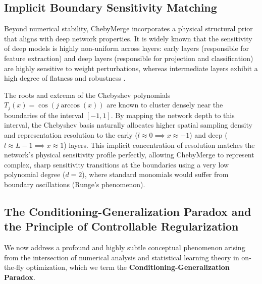 \subsection{Implicit Boundary Sensitivity Matching}
Beyond numerical stability, ChebyMerge incorporates a physical structural prior that aligns with deep network properties. It is widely known that the sensitivity of deep models is highly non-uniform across layers: early layers (responsible for feature extraction) and deep layers (responsible for projection and classification) are highly sensitive to weight perturbations, whereas intermediate layers exhibit a high degree of flatness and robustness \cite{zhang2019all}.

The roots and extrema of the Chebyshev polynomials $T_j(x) = \cos(j \arccos(x))$ are known to cluster densely near the boundaries of the interval $[-1, 1]$. By mapping the network depth to this interval, the Chebyshev basis naturally allocates higher spatial sampling density and representation resolution to the early ($l \approx 0 \implies x \approx -1$) and deep ($l \approx L-1 \implies x \approx 1$) layers. This implicit concentration of resolution matches the network's physical sensitivity profile perfectly, allowing ChebyMerge to represent complex, sharp sensitivity transitions at the boundaries using a very low polynomial degree ($d=2$), where standard monomials would suffer from boundary oscillations (Runge's phenomenon).

\subsection{The Conditioning-Generalization Paradox and the Principle of Controllable Regularization}
\label{sec:paradox}

We now address a profound and highly subtle conceptual phenomenon arising from the intersection of numerical analysis and statistical learning theory in on-the-fly optimization, which we term the \textbf{Conditioning-Generalization Paradox}. 

